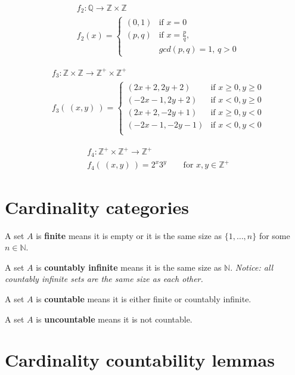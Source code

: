 \documentclass[12pt, oneside]{article}
\begin{document}
\vspace{30pt}


\begin{align*}
    &f_2: \mathbb{Q} \to \mathbb{Z} \times \mathbb{Z} \\
    &f_2(x) = \begin{cases}
        (0,1) & \text{if $x = 0$} \\
        (p,q) & \text{if $x = \frac{p}{q}$,}\\
                & \text{$gcd(p,q) = 1$, $q > 0$}
    \end{cases}
\end{align*}
\begin{multicols}{2}
\begin{align*}
    &f_3: \mathbb{Z} \times \mathbb{Z} \to \mathbb{Z}^+ \times \mathbb{Z}^+ \\
    &f_3(~(x,y)~) = \begin{cases}
        (2x+2, 2y+2) & \text{if $x \geq 0, y \geq 0$} \\
        (-2x-1, 2y+2) & \text{if $x < 0, y \geq 0$} \\
        (2x+2, -2y+1) & \text{if $x \geq 0, y < 0$} \\
        (-2x-1, -2y-1) & \text{if $x < 0, y < 0$} \\
    \end{cases}
\end{align*}

\begin{align*}
    &f_4: \mathbb{Z}^+ \times \mathbb{Z}^+ \to \mathbb{Z}^+ \\
    &f_4(~(x,y)~) = 2^x 3^y \qquad \text{for $x,y \in \mathbb{Z}^+$}
\end{align*}
\end{multicols} \vfill
\section*{Cardinality categories}


A set $A$ is {\bf finite} means it is empty or it is the same size as $\{ 1, \ldots, n \}$ for some $n \in \mathbb{N}$.

A set $A$ is {\bf countably infinite} means it is the same size as $\mathbb{N}$. {\it Notice: 
all countably infinite sets are the same size as each other.}

A set $A$ is {\bf countable} means it is either finite or countably infinite.

A set $A$ is {\bf uncountable} means it is not countable. \vfill
\section*{Cardinality countability lemmas}
\end{document}

